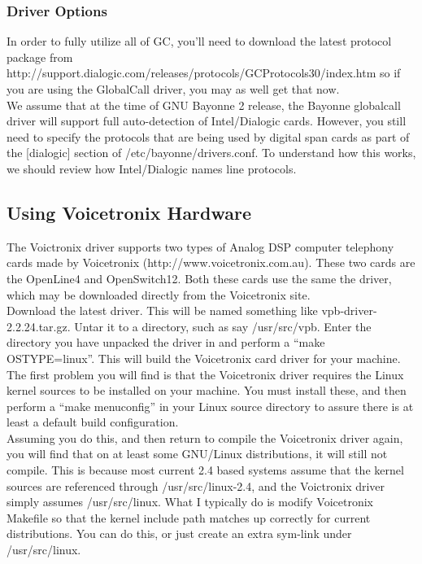 \documentclass[a4paper,12pt]{article}
\begin{document}
\subsubsection{Driver Options}

In order to fully utilize all of GC, you'll need to download the latest
protocol package from
http://support.dialogic.com/releases/protocols/GCProtocols30/index.htm
so if you are using the GlobalCall driver, you may as well get that now.
\\

We assume that at the time of GNU Bayonne 2 release, the Bayonne
globalcall driver will support full auto-detection of Intel/Dialogic
cards.  However, you still need to specify the protocols that are being
used by digital span cards as part of the [dialogic] section of
/etc/bayonne/drivers.conf.  To understand how this works, we should
review how Intel/Dialogic names line protocols. \\

\subsection{Using Voicetronix Hardware}

The Voictronix driver supports two types of Analog DSP computer telephony
cards made by Voicetronix (http://www.voicetronix.com.au).  These two
cards are the OpenLine4 and OpenSwitch12.  Both these cards use the same
the driver, which may be downloaded directly from the Voicetronix site. \\

Download the latest driver. This will be named something like
vpb-driver-2.2.24.tar.gz.  Untar it to a directory, such as say
/usr/src/vpb.  Enter the directory you have unpacked the driver in and
perform a ``make OSTYPE=linux''.  This will build the Voicetronix card
driver for your machine. \\

The first problem you will find is that the Voicetronix driver requires
the Linux kernel sources to be installed on your machine.  You must
install these, and then perform a ``make menuconfig'' in your Linux source
directory to assure there is at least a default build configuration. \\

Assuming you do this, and then return to compile the Voicetronix driver
again, you will find that on at least some GNU/Linux distributions, it
will still not compile.  This is because most current 2.4 based systems
assume that the kernel sources are referenced through /usr/src/linux-2.4,
and the Voictronix driver simply assumes /usr/src/linux. What I typically
do is modify Voicetronix Makefile so that the kernel include path matches
up correctly for current distributions.  You can do this, or just create
an extra sym-link under /usr/src/linux. \\
\end{document}
